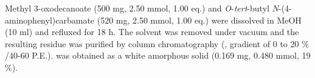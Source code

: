 Methyl 3-oxodecanoate  (500 mg, 2.50 mmol, 1.00 eq.) and \textit{O}-\textit{tert}-butyl \textit{N}-(4-aminophenyl)carbamate  (520 mg, 2.50 mmol, 1.00 eq.) were dissolved in MeOH (10 ml) and refluxed for 18 h. The solvent was removed under vacuum and the resulting residue was purified by column chromatography (, gradient of 0 to 20 \% /40-60 P.E.).  was obtained as a white amorphous solid (0.169 mg, 0.480 mmol, 19 \%).
\\[1\baselineskip]
\\[1\baselineskip]
\\[1\baselineskip]
\\[1\baselineskip]
